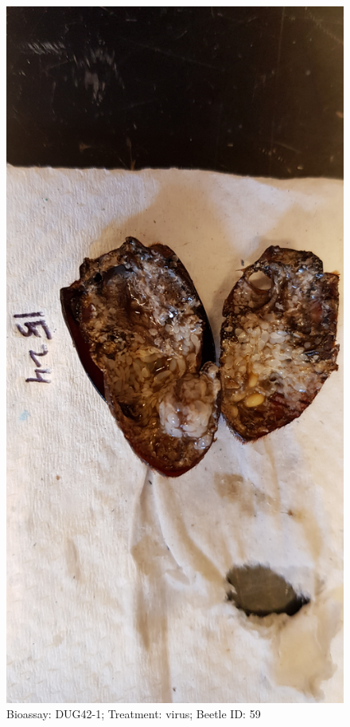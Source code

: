 \documentclass[11pt]{scrartcl}
\begin{document}
\begin{figure}[h!]
    \centering
    \includegraphics[width=\linewidth, height=\textheight, keepaspectratio]{uploads/btl.pm_image.873c1f3fdf74a9dc.447567343220313532345f5265702d312076697275732e6a7067.jpg}
    \caption{Bioassay: DUG42-1; Treatment: virus; Beetle ID: 59}
\end{figure}
\clearpage
\end{document}
